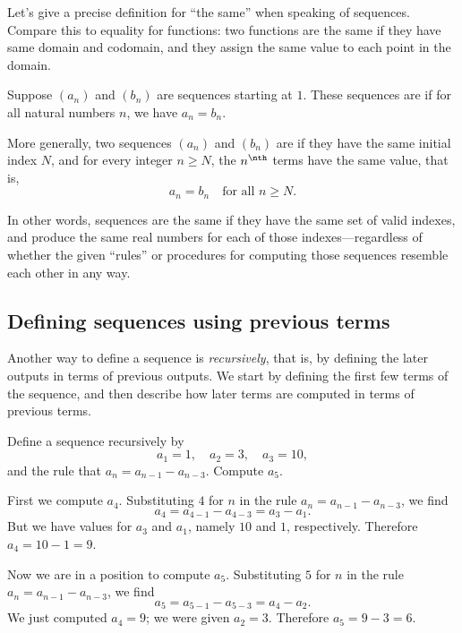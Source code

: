 \documentclass{ximera}
\begin{document}
Let's give a precise definition for ``the same'' when speaking of
sequences.  Compare this to equality for functions: two functions are
the same if they have same domain and codomain, and they assign the
same value to each point in the domain.


\begin{definition}
  Suppose $(a_n)$ and $(b_n)$ are sequences starting at $1$.  These
  sequences are  if for all
  natural numbers $n$, we have $a_n = b_n$.

  More generally, two sequences $(a_n)$ and $(b_n)$ are
   if they have the same initial index $N$, and for
  every integer $n \geq N$, the $n^{\nth}$ terms have the same value, that is,
  \[
  a_n = b_n \quad \mbox{for all $n \geq N$.}
  \]
\end{definition}
In other words, sequences are the same if they have the same set of
valid indexes, and produce the same real numbers for each of those
indexes---regardless of whether the given ``rules'' or procedures for
computing those sequences resemble each other in any way.

\subsection{Defining sequences using previous terms}
\label{subsection:recursive-definition}

Another way to define a sequence is \textit{recursively}, that is, by
defining the later outputs in terms of previous outputs.  We start by
defining the first few terms of the sequence, and then describe how
later terms are computed in terms of previous terms.

\begin{example}
Define a sequence recursively by
$$
a_1 = 1, \quad a_2 = 3, \quad a_3 = 10,
$$
and the rule that $a_n = a_{n-1} - a_{n-3}$.  Compute $a_5$.
\end{example}

\begin{worked-solution}
  First we compute $a_4$.  Substituting $4$ for $n$ in the rule $a_n = a_{n-1} - a_{n-3}$, we find
$$
a_4 = a_{4-1} - a_{4-3} = a_3 - a_1.
$$
But we have values for $a_3$ and $a_1$, namely $10$ and $1$, respectively.  Therefore $a_4 = 10 - 1 = 9$.

Now we are in a position to compute $a_5$.  Substituting $5$ for $n$ in the rule $a_n = a_{n-1} - a_{n-3}$, we find
$$
a_5 = a_{5-1} - a_{5-3} = a_4 - a_2.
$$
We just computed $a_4 = 9$; we were given $a_2 = 3$.  Therefore $a_5 = 9 - 3 = 6$.
\end{worked-solution}
\end{document}
